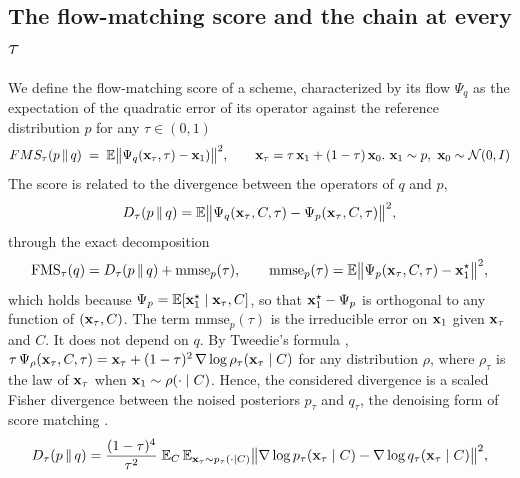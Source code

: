 \subsection{The flow-matching score and the chain at every \texorpdfstring{$\tau$}{τ}}

We define the flow-matching score of a scheme, characterized by its flow $\Psi_q$  as the expectation of the quadratic error of its operator against the reference distribution $p$ for any $\tau \in (0,1)$ 
\begin{equation}\label{eq:fms}
  FMS_\tau(p \,\|\, q) \;=\; \mathbb{E}\big\|\Psi_q(\mathbf{x}_\tau, \tau) - \mathbf{x}_1)\big\|^2,
  \qquad \mathbf{x}_\tau = \tau\, \mathbf{x}_1 + (1-\tau)\, \mathbf{x}_0 . \ \mathbf{x}_1 \sim p, \ \mathbf{x}_0 \sim \mathcal{N}(0, I)
\end{equation}
The score is related to the divergence between the operators of $q$ and  $p$,
\begin{equation}\label{eq:div}
  D_\tau(p\,\|\,q) = \mathbb{E}\big\|\Psi_q(\mathbf{x}_\tau, C, \tau) - \Psi_p(\mathbf{x}_\tau, C, \tau)\big\|^2 ,
\end{equation}
through the exact decomposition
\begin{equation}\label{eq:fms_div}
  \mathrm{FMS}_\tau(q) = D_\tau(p\,\|\,q) + \mathrm{mmse}_p(\tau),
  \qquad
  \mathrm{mmse}_p(\tau) = \mathbb{E}\big\|\Psi_p(\mathbf{x}_\tau, C, \tau) - \mathbf{x}_1^\star\big\|^2 ,
\end{equation}
which holds because $\Psi_p = \mathbb{E}[\mathbf{x}_1^\star \mid \mathbf{x}_\tau, C]$, so that
$\mathbf{x}_1^\star - \Psi_p$ is orthogonal to any function of $(\mathbf{x}_\tau, C)$. The term
$\mathrm{mmse}_p(\tau)$ is the irreducible error on $\mathbf{x}_1$ given $\mathbf{x}_\tau$ and $C$. It does not depend on $q$. By Tweedie's formula \cite{efron_tweedies_2011,robbins_empirical_1992},
$\tau\,\Psi_\rho(\mathbf{x}_\tau, C, \tau) = \mathbf{x}_\tau + (1-\tau)^2\,\nabla \log \rho_\tau(\mathbf{x}_\tau \mid C)$
for any distribution $\rho$, where $\rho_\tau$ is the law of $\mathbf{x}_\tau$ when
$\mathbf{x}_1 \sim \rho(\cdot \mid C)$. Hence, the considered divergence is a scaled Fisher divergence between the noised posteriors $p_\tau$ and $q_\tau$, the denoising form of score matching \cite{hyvarinen_estimation_2005,vincent_connection_2011}.
\begin{equation}\label{eq:fisher}
  D_\tau(p\,\|\,q) = \frac{(1-\tau)^4}{\tau^2}\;
  \mathbb{E}_{C}\,\mathbb{E}_{\mathbf{x}_\tau \sim p_\tau(\cdot \mid C)}
  \big\|\nabla \log p_\tau(\mathbf{x}_\tau \mid C) - \nabla \log q_\tau(\mathbf{x}_\tau \mid C)\big\|^2 ,
\end{equation}

